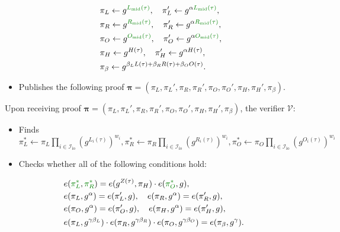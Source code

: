 \documentclass[../lecture-notes.tex]{subfiles}
\begin{document}
\begin{tcolorbox}
\begin{itemize}[label=]
\begin{align*}
            &\pi_L \gets g^{\textcolor{green!50!black}{L_{\text{mid}}(\tau)}}, \quad \pi_L' \gets g^{\alpha \textcolor{green!50!black}{L_{\text{mid}}(\tau)}}, \\
            &\pi_R \gets g^{\textcolor{green!50!black}{R_{\text{mid}}(\tau)}}, \quad \pi_R' \gets g^{\alpha \textcolor{green!50!black}{R_{\text{mid}}(\tau)}}, \\
            &\pi_O \gets g^{\textcolor{green!50!black}{O_{\text{mid}}(\tau)}}, \quad \pi_O' \gets g^{\alpha \textcolor{green!50!black}{O_{\text{mid}}(\tau)}}, \\
            &\pi_H \gets g^{H(\tau)}, \quad \pi_H' \gets g^{\alpha H(\tau)}, \\
            &\pi_{\beta} \gets g^{\beta_LL(\tau) + \beta_RR(\tau) + \beta_OO(\tau)}.
        \end{align*}
        \item Publishes the following proof $\boldsymbol{\pi} = (\pi_L,\pi_L',\pi_R,\pi_R',\pi_O,\pi_O',\pi_H,\pi_H',\pi_{\beta})$.
    \end{itemize}

    Upon receiving proof $\boldsymbol{\pi} = (\pi_L,\pi_L',\pi_R,\pi_R',\pi_O,\pi_O',\pi_H,\pi_H',\pi_{\beta})$, the verifier $\mathcal{V}$:
    \begin{itemize}[label=]
        \item \textcolor{green!50!black}{Finds $\pi_L^* \gets \pi_L\prod_{i \in \mathcal{I}_{\text{io}}} (g^{L_i(\tau)})^{w_i},\pi_R^* \gets \pi_R\prod_{i \in \mathcal{I}_{\text{io}}} (g^{R_i(\tau)})^{w_i},\pi_O^* \gets \pi_O\prod_{i \in \mathcal{I}_{\text{io}}} (g^{O_i(\tau)})^{w_i}$}
        \item Checks whether all of the following conditions hold:
    \end{itemize}
    \begin{align*}
        &e(\textcolor{green!50!black}{\pi_L^*}, \textcolor{green!50!black}{\pi_R^*}) = e(g^{Z(\tau)}, \pi_H) \cdot e(\textcolor{green!50!black}{\pi_O^*}, g),\\
        &e(\pi_L, g^{\alpha}) = e(\pi_L', g), \quad e(\pi_R, g^{\alpha}) = e(\pi_R', g), \\
        &e(\pi_O, g^{\alpha}) = e(\pi_O', g), \quad e(\pi_H, g^{\alpha}) = e(\pi_H', g), \\
        &e(\pi_L, g^{\gamma\beta_L}) \cdot e(\pi_R, g^{\gamma\beta_R}) \cdot e(\pi_O, g^{\gamma\beta_O}) = e(\pi_{\beta}, g^{\gamma}).
    \end{align*}
\end{tcolorbox}
\end{document}
